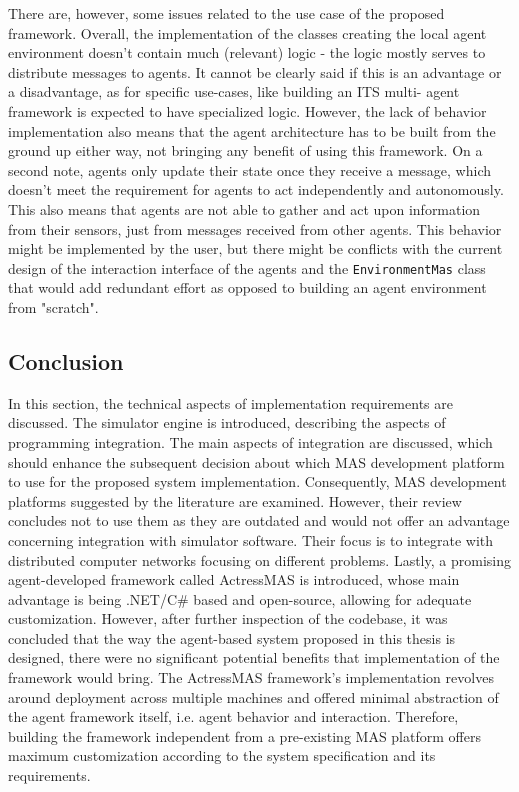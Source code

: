 \documentclass[0main.tex]{subfiles}
\begin{document}
There are, however, some issues related to the use case of the proposed framework. Overall, the implementation of the classes 
creating the local agent environment doesn't contain much (relevant) logic - the logic mostly serves to distribute messages to agents. 
It cannot be clearly said if this is an advantage or a disadvantage, as for specific use-cases, like building an ITS multi-
agent framework is expected to have specialized logic. However, the lack of behavior implementation also means that the 
agent architecture has to be built from the ground up either way, not bringing any benefit of using this framework. 
On a second note, agents only update their state once they receive a message, which doesn't 
meet the requirement for agents to act independently and autonomously. This also means that agents are not able to gather 
and act upon information from their sensors, just from messages received from other agents. This behavior might be implemented 
by the user, but there might be conflicts with the current design of the interaction interface of the agents and the 
\texttt{EnvironmentMas} class that would add redundant effort as opposed to building an agent environment from "scratch". 

\subsection{Conclusion}

In this section, the technical aspects of implementation requirements are discussed. The
simulator engine is introduced, describing the aspects of programming integration. The main
aspects of integration are discussed, which should enhance the subsequent decision about
which MAS development platform to use for the proposed system implementation. Consequently, MAS
development platforms suggested by the literature are examined. However, their review concludes
not to use them as they are outdated and would not offer an advantage concerning integration
with simulator software. Their focus is to integrate with distributed computer networks
focusing on different problems. Lastly, a promising agent-developed framework called 
ActressMAS is introduced, whose main advantage is being .NET/C\# based
and open-source, allowing for adequate customization. However, after further inspection of the
codebase, it was concluded that the way the agent-based system proposed in this thesis is
designed, there were no significant potential benefits that implementation of the framework 
would bring. The ActressMAS framework's implementation revolves around deployment across 
multiple machines and offered minimal abstraction of the agent framework itself, i.e. 
agent behavior and interaction. Therefore, building the framework independent from a
pre-existing MAS platform offers maximum customization according to the system
specification and its requirements. 

\clearpage
\end{document}
